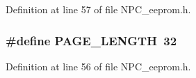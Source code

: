 Definition at line 57 of file N\+P\+C\+\_\+eeprom.\+h.

\subsubsection[{\texorpdfstring{P\+A\+G\+E\+\_\+\+L\+E\+N\+G\+TH}{PAGE_LENGTH}}]{\setlength{\rightskip}{0pt plus 5cm}\#define P\+A\+G\+E\+\_\+\+L\+E\+N\+G\+TH~32}\hypertarget{group___utilities_gaa583f25d8bd438def94d50dff97b468d}{}\label{group___utilities_gaa583f25d8bd438def94d50dff97b468d}


Definition at line 56 of file N\+P\+C\+\_\+eeprom.\+h.

